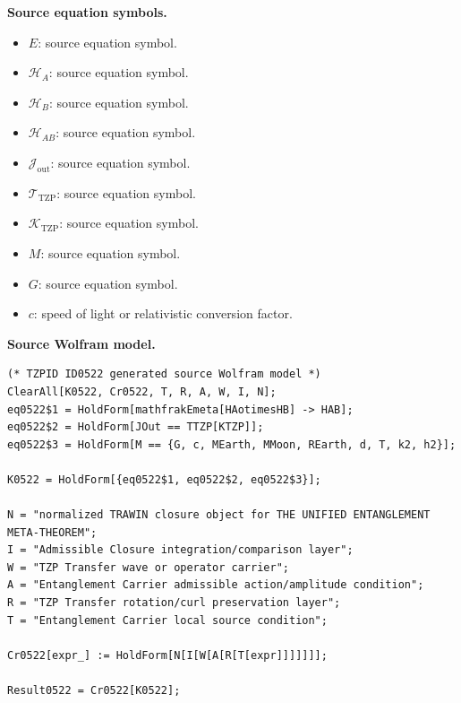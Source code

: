 \begin{minipage}[t]{0.49\linewidth}
\begingroup
\small
\raggedright
\textbf{Source equation symbols.}\par
\begin{itemize}[leftmargin=1.35em,itemsep=1pt,topsep=1pt,parsep=0pt]
    \item $E$: source equation symbol.
    \item $\mathcal{H}_A$: source equation symbol.
    \item $\mathcal{H}_B$: source equation symbol.
    \item $\mathcal{H}_{AB}$: source equation symbol.
    \item $\mathcal{J}_{\mathrm{out}}$: source equation symbol.
    \item $\mathcal{T}_{\mathrm{TZP}}$: source equation symbol.
    \item $\mathcal{K}_{\mathrm{TZP}}$: source equation symbol.
    \item $M$: source equation symbol.
    \item $G$: source equation symbol.
    \item $c$: speed of light or relativistic conversion factor.
\end{itemize}
\endgroup
\end{minipage}\hfill
\begin{minipage}[t]{0.47\linewidth}
\begingroup
\scriptsize
\raggedright
\textbf{Source Wolfram model.}\par
\begin{Verbatim}[fontsize=\tiny,breaklines=true,breakanywhere=true]
(* TZPID ID0522 generated source Wolfram model *)
ClearAll[K0522, Cr0522, T, R, A, W, I, N];
eq0522$1 = HoldForm[mathfrakEmeta[HAotimesHB] -> HAB];
eq0522$2 = HoldForm[JOut == TTZP[KTZP]];
eq0522$3 = HoldForm[M == {G, c, MEarth, MMoon, REarth, d, T, k2, h2}];

K0522 = HoldForm[{eq0522$1, eq0522$2, eq0522$3}];

N = "normalized TRAWIN closure object for THE UNIFIED ENTANGLEMENT META-THEOREM";
I = "Admissible Closure integration/comparison layer";
W = "TZP Transfer wave or operator carrier";
A = "Entanglement Carrier admissible action/amplitude condition";
R = "TZP Transfer rotation/curl preservation layer";
T = "Entanglement Carrier local source condition";

Cr0522[expr_] := HoldForm[N[I[W[A[R[T[expr]]]]]]];

Result0522 = Cr0522[K0522];
\end{Verbatim}
\endgroup
\end{minipage}

